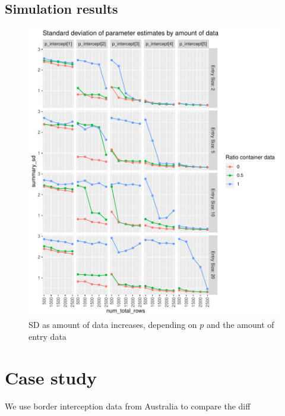 \documentclass{article}
\begin{document}
\subsection{Simulation results}

\begin{figure}[h!]
\includegraphics[width=\textwidth]{../visualisations/figures/sim_study_pint_vs_data_vs_entry_size.pdf}
\caption{SD as amount of data increases, depending on \(p\) and the amount of entry data}
\label{fig:SD_est_simulated}
\end{figure}




\section{Case study}
We use border interception data from Australia to compare the diff
\end{document}
